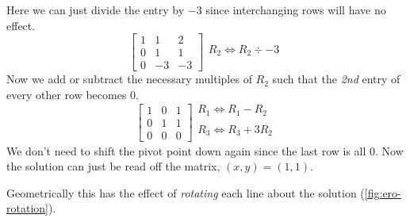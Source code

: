 \documentclass{tufte-book}
\begin{document}
Here we can just divide the entry by $-3$ since interchanging rows will have no effect.
\begin{equation*}
	\left[
		\begin{array}{cc|c}
			1 & 1         & 2  \\
			0 & \boxed{1} & 1  \\
			0 & -3        & -3
		\end{array}
		\right]
	\begin{array}{l}
		\\
		R_2 \iff R_2 \div -3 \\
		\\
	\end{array}
\end{equation*}
Now we add or subtract the necessary multiples of $R_2$ such that the \emph{2nd} entry of every other row becomes
0.
\begin{equation*}
	\left[
		\begin{array}{cc|c}
			1 & 0         & 1 \\
			0 & \boxed{1} & 1 \\
			0 & 0         & 0
		\end{array}
		\right]
	\begin{array}{l}
		R_1 \iff R_1 - R_2  \\
		\\
		R_3 \iff R_3 + 3R_2 \\
	\end{array}
\end{equation*}
We don't need to shift the pivot point down again since the last row is all 0. Now the solution can just be read
off the matrix, $(x,y)=(1,1)$.

\begin{marginfigure}[-0cm]
	\caption{Elementary row operations rotate lines about their solution.}
	\label{fig:ero-rotation}
\end{marginfigure}
Geometrically this has the effect of \emph{rotating} each line about the solution (\cref{fig:ero-rotation}).
\end{document}
